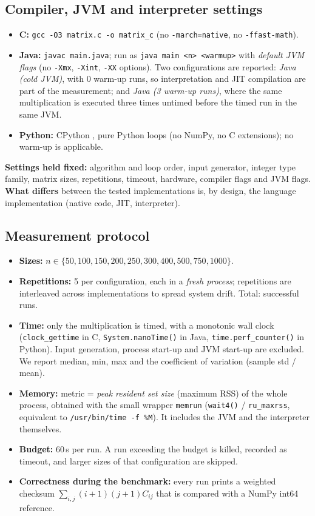 \documentclass[11pt,a4paper]{article}
\begin{document}
\subsection{Compiler, JVM and interpreter settings}
\begin{itemize}
  \item \textbf{C:} \texttt{gcc -O3 matrix.c -o matrix\_c} (no \texttt{-march=native}, no \texttt{-ffast-math}).
  \item \textbf{Java:} \texttt{javac main.java}; run as \texttt{java main <n> <warmup>} with \emph{default JVM flags}
        (no \texttt{-Xmx}, \texttt{-Xint}, \texttt{-XX} options). Two configurations are reported:
        \emph{Java (cold JVM)}, with 0 warm-up runs, so interpretation and JIT compilation are part of the
        measurement; and \emph{Java (3 warm-up runs)}, where the same multiplication is executed three times
        untimed before the timed run in the same JVM.
  \item \textbf{Python:} CPython \EnvPython{}, pure Python loops (no NumPy, no C extensions); no warm-up is
        applicable.
\end{itemize}
\textbf{Settings held fixed:} algorithm and loop order, input generator, integer type family, matrix sizes, repetitions,
timeout, hardware, compiler flags and JVM flags. \textbf{What differs} between the tested implementations is, by design,
the language implementation (native code, JIT, interpreter).

\subsection{Measurement protocol}
\begin{itemize}
  \item \textbf{Sizes:} $n\in\{50,100,150,200,250,300,400,500,750,1000\}$.
  \item \textbf{Repetitions:} 5 per configuration, each in a \emph{fresh process}; repetitions are interleaved
        across implementations to spread system drift. Total: \NRuns{} successful runs.
  \item \textbf{Time:} only the multiplication is timed, with a monotonic wall clock
        (\texttt{clock\_gettime} in C, \texttt{System.nanoTime()} in Java, \texttt{time.perf\_counter()} in Python).
        Input generation, process start-up and JVM start-up are excluded. We report median, min, max and
        the coefficient of variation (sample std / mean).
  \item \textbf{Memory:} metric = \emph{peak resident set size} (maximum RSS) of the whole process, obtained with the
        small wrapper \texttt{memrun} (\texttt{wait4()} / \texttt{ru\_maxrss}, equivalent to \texttt{/usr/bin/time -f \%M}).
        It includes the JVM and the interpreter themselves.
  \item \textbf{Budget:} 60\,s per run. A run exceeding the budget is killed, recorded as timeout, and larger sizes of
        that configuration are skipped.
  \item \textbf{Correctness during the benchmark:} every run prints a weighted checksum
        $\sum_{i,j}(i+1)(j+1)C_{ij}$ that is compared with a NumPy int64 reference.
\end{itemize}
\end{document}
